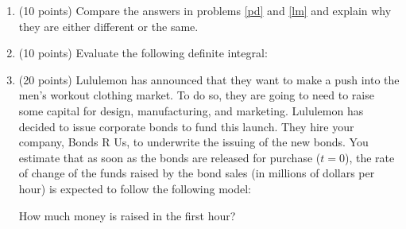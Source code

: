\documentclass[letterpaper,12pt,fleqn]{article}
\begin{document}
\begin{enumerate}[left=0pt]
  \bigskip

  \newpage

\item (10 points) Compare the answers in problems \ref{pd} and \ref{lm} and explain why they are either different or the same.

  \vspace{3in}

\item (10 points) Evaluate the following definite integral:

  \bigskip

  \begin{center}
  \end{center}

  \bigskip

  \newpage

\item (20 points) Lululemon has announced that they want to make a push into the men's workout clothing market.  To do so, they
  are going to need to raise some capital for design, manufacturing, and marketing.  Lululemon has decided to issue corporate
  bonds to fund this launch.  They hire your company, Bonds R Us, to underwrite the issuing of the new bonds.  You estimate
  that as soon as the bonds are released for purchase (\(t=0\)), the rate of change of the funds raised by the bond sales
  (in millions of dollars per hour) is expected to follow the following model:

  \bigskip

  \begin{center}
  \end{center}

  \bigskip

  How much money is raised in the first hour?
\end{enumerate}
\end{document}
